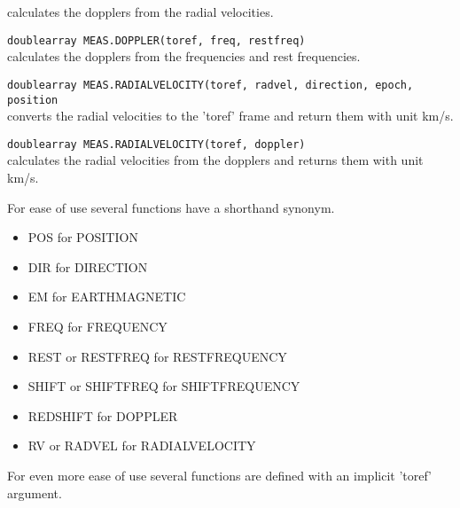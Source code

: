 \begin{description}
    calculates the dopplers from the radial velocities.
  \item[] \texttt{doublearray MEAS.DOPPLER(toref, freq, restfreq)}\\
    calculates the dopplers from the frequencies and rest frequencies.
  \item[] \texttt{doublearray MEAS.RADIALVELOCITY(toref, radvel, direction, epoch, position}\\
    converts the radial velocities to the 'toref' frame and return
    them with unit km/s.
  \item[] \texttt{doublearray MEAS.RADIALVELOCITY(toref, doppler)}\\
    calculates the radial velocities from the dopplers and returns
    them with unit km/s.
\end{description}
For ease of use several functions have a shorthand synonym.
\begin{itemize}
  \item POS for POSITION
  \item DIR for DIRECTION
  \item EM for EARTHMAGNETIC
  \item FREQ for FREQUENCY
  \item REST or RESTFREQ for RESTFREQUENCY
  \item SHIFT or SHIFTFREQ for SHIFTFREQUENCY
  \item REDSHIFT for DOPPLER
  \item RV or RADVEL for RADIALVELOCITY
\end{itemize}
For even more ease of use several functions are defined with an implicit 'toref' argument.
